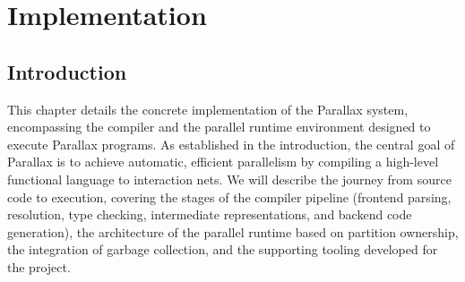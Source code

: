 \chapter{Implementation}

\section{Introduction}
This chapter details the concrete implementation of the Parallax system, encompassing the compiler and the parallel runtime environment designed to execute Parallax programs. As established in the introduction, the central goal of Parallax is to achieve automatic, efficient parallelism by compiling a high-level functional language to interaction nets. We will describe the journey from source code to execution, covering the stages of the compiler pipeline (frontend parsing, resolution, type checking, intermediate representations, and backend code generation), the architecture of the parallel runtime based on partition ownership, the integration of garbage collection, and the supporting tooling developed for the project.

